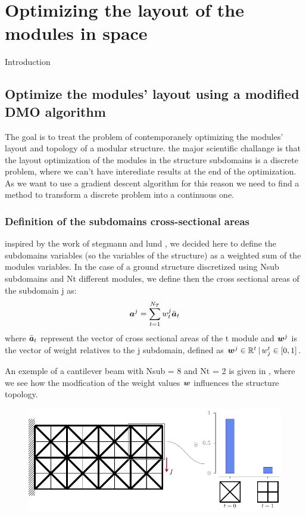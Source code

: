 \setchapterpreamble[u]{\margintoc}
\glsresetall %
\chapter{Optimizing the layout of the modules in space}
Introduction

\section{Optimize the modules' layout using a modified DMO algorithm}
The goal is to treat the problem of contemporanely optimizing the modules' layout and topology of a modular structure. the major scientific challange is that the layout optimization of the modules in the structure subdomains is a discrete problem, where we can't have interediate results at the end of the optimization. As we want to use a gradient descent algorithm  for this reason we need to find a method to transform a discrete problem into a continuous one. 

\subsection{Definition of the subdomains cross-sectional areas}
inspired by the work of stegmann and lund  , we decided here to define the subdomains variables (so the variables of the structure) as a weighted sum of the modules variables. In the case of a ground structure discretized using Nsub subdomains and Nt different modules, we define then the cross sectional areas of the subdomain j as:
\begin{equation}
    \bm{a}^j = \sum_{t=1}^{N_T} w_t^j \bar{\bm{a}}_t 
\end{equation}
where $\bar{\bm{a}}_t $ represent the vector of cross sectional areas of the t module and $\bm{w}^j$ is the vector of weight relatives to the j subdomain, defined as $ \bm{w}^j \in \mathbb{R}^t\,|\,w_j^t \in [0,1]$. 

An exemple of a cantilever beam with Nsub = 8 and Nt = 2 is given in , where we see how the modfication of the weight values $\bm{w}$ influences the structure topology.


\begin{figure}
    \centering
    \includegraphics{figures/06_DMO/00_weight_dmo/weight_dmo.pdf}
    \caption{}
    \label{fig:06_weighted_sum}
\end{figure}

